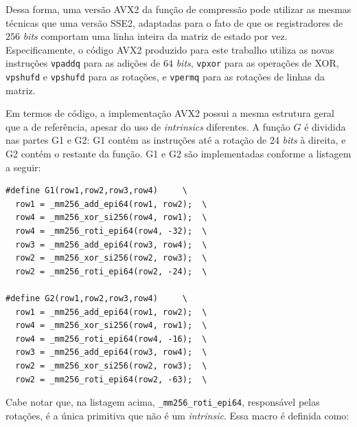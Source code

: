 \documentclass{article}
\begin{document}
Dessa forma, uma versão AVX2 da função de compressão pode utilizar as
mesmas técnicas que uma versão SSE2, adaptadas para o fato de que os
registradores de $256$ \emph{bits} comportam uma linha inteira da matriz de
estado por vez. Especificamente, o código AVX2 produzido para este
trabalho utiliza as novas instruções \texttt{vpaddq} para as adições de
$64$ \emph{bits}, \texttt{vpxor} para as operações de XOR, \texttt{vpshufd} e
\texttt{vpshufd} para as rotações, e \texttt{vpermq} para as rotações de
linhas da matriz.

Em termos de código, a implementação AVX2 possui a mesma estrutura
geral que a de referência, apesar do uso de \emph{intrinsics}
diferentes. A função $G$ é dividida nas partes G1 e G2: G1 contém as
instruções até a rotação de 24 \emph{bits} à direita, e G2 contém o restante da
função. G1 e G2 são implementadas conforme a listagem a seguir:

\begin{small}
\begin{verbatim}
#define G1(row1,row2,row3,row4)		\
  row1 = _mm256_add_epi64(row1, row2);	\
  row4 = _mm256_xor_si256(row4, row1);	\
  row4 = _mm256_roti_epi64(row4, -32);	\
  row3 = _mm256_add_epi64(row3, row4);	\
  row2 = _mm256_xor_si256(row2, row3);	\
  row2 = _mm256_roti_epi64(row2, -24);	\

#define G2(row1,row2,row3,row4)		\
  row1 = _mm256_add_epi64(row1, row2);	\
  row4 = _mm256_xor_si256(row4, row1);	\
  row4 = _mm256_roti_epi64(row4, -16);	\
  row3 = _mm256_add_epi64(row3, row4);	\
  row2 = _mm256_xor_si256(row2, row3);	\
  row2 = _mm256_roti_epi64(row2, -63);	\
\end{verbatim}
\end{small}

Cabe notar que, na listagem acima, \texttt{\_mm256\_roti\_epi64},
responsável pelas rotações, é a única primitiva que não é um
\emph{intrinsic}. Essa macro é definida como:
\end{document}
